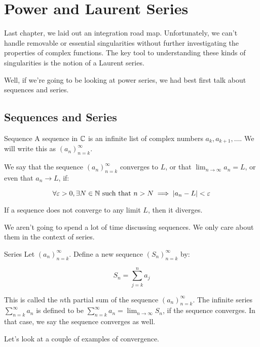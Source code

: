 \chapter{Power and Laurent Series}

Last chapter, we laid out an integration road map. Unfortunately, we can't handle removable or essential singularities without further investigating the properties of complex functions. The key tool to understanding these kinds of singularities is the notion of a Laurent series.

Well, if we're going to be looking at power series, we had best first talk about sequences and series.

\section{Sequences and Series}

\begin{defbo}{Sequence}{} A sequence in $\mathbb{C}$ is an infinite list of complex numbers $a_k,a_{k+1},\dots$. We will write this as $(a_n)_{n = k}^\infty$.

We say that the sequence $(a_n)_{n = k}^\infty$ converges to $L$, or that $\lim_{n\rightarrow \infty} a_n = L$, or even that $a_n \rightarrow L$, if:

$$\forall \varepsilon > 0, \exists N\in \mathbb{N} \text{ such that } n > N \implies |a_n - L|< \varepsilon$$

If a sequence does not converge to any limit $L$, then it diverges.
\end{defbo}

We aren't going to spend a lot of time discussing sequences. We only care about them in the context of series.

\begin{defbo}{Series}{} Let $(a_n)_{n = k}^\infty$. Define a new sequence $(S_n)_{n = k}^\infty$ by:

$$S_n  = \sum_{j = k}^n a_j$$

This is called the $n$th partial sum of the sequence $(a_n)_{n = k}^\infty$. The infinite series $\sum_{n = k}^\infty a_n$ is defined to be $\sum_{n = k}^\infty a_n = \lim_{n \rightarrow \infty} S_n$, if the sequence converges. In that case, we say the sequence converges as well.
\end{defbo}

Let's look at a couple of examples of convergence.

